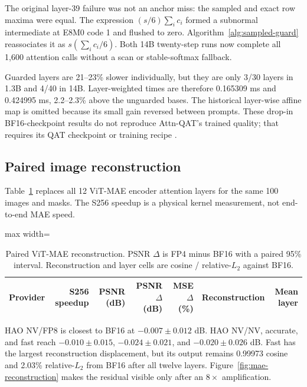 The original layer-39 failure was not an anchor miss: the sampled and exact
row maxima were equal. The expression $(s/6)\sum_i c_i$ formed a subnormal
intermediate at E8M0 code 1 and flushed to zero. Algorithm~\ref{alg:sampled-guard}
reassociates it as $s(\sum_i c_i/6)$. Both 14B twenty-step runs now complete
all 1,600 attention calls without a scan or stable-softmax fallback.

Guarded layers are 21--23\% slower individually, but they are only 3/30 layers
in 1.3B and 4/40 in 14B. Layer-weighted times are therefore 0.165309 ms and
0.424995 ms, 2.2--2.3\% above the unguarded bases. The historical layer-wise
affine map is omitted because its small gain reversed between prompts. These
drop-in BF16-checkpoint results do not reproduce Attn-QAT's trained quality;
that requires its QAT checkpoint or training recipe \cite{zhang2026attnqat}.

\subsection{Paired image reconstruction}

Table~\ref{tab:mae-reconstruction} replaces all 12 ViT-MAE encoder attention
layers for the same 100 images and masks. The S256 speedup is a physical kernel
measurement, not end-to-end MAE speed.

\begin{table}[htbp]
\centering
\caption{Paired ViT-MAE reconstruction. PSNR $\Delta$ is FP4 minus BF16 with
a paired 95\% interval. Reconstruction and layer cells are cosine /
relative-$L_2$ against BF16.}
\label{tab:mae-reconstruction}
\scriptsize
\begin{adjustbox}{max width=\textwidth}
\begin{tabular}{lrrrrrr}
\toprule
Provider & S256 speedup & PSNR (dB) & PSNR $\Delta$ (dB)
& MSE $\Delta$ (\%) & Reconstruction & Mean layer \\
\midrule
%
\end{tabular}
\end{adjustbox}
\end{table}

HAO NV/FP8 is closest to BF16 at $-0.007\pm0.012$ dB. HAO NV/NV, accurate,
and fast reach $-0.010\pm0.015$, $-0.024\pm0.021$, and
$-0.020\pm0.026$ dB. Fast has the largest reconstruction displacement, but
its output remains 0.99973 cosine and 2.03\% relative-$L_2$ from BF16 after
all twelve layers. Figure~\ref{fig:mae-reconstruction} makes the residual
visible only after an $8\times$ amplification.

